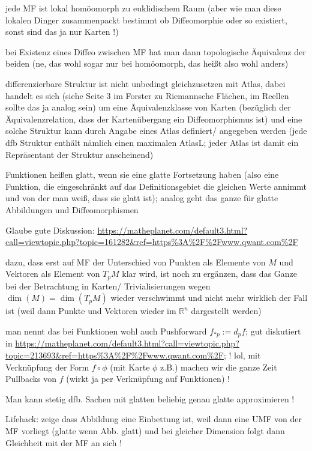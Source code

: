 jede MF ist lokal homöomorph zu euklidischem Raum (aber wie man diese lokalen Dinger zusammenpackt bestimmt ob Diffeomorphie oder so existiert, sonst sind das ja nur Karten !)


bei Existenz eines Diffeo zwischen MF hat man dann topologische Äquivalenz der beiden (ne, das wohl sogar nur bei homöomorph, das heißt also wohl anders)


differenzierbare Struktur ist nicht unbedingt gleichzusetzen mit Atlas, dabei handelt es sich (siehe Seite 3 im Forster zu Riemannsche Flächen, im Reellen sollte das ja analog sein) um eine Äquivalenzklasse von Karten (bezüglich der Äquivalenzrelation, dass der Kartenübergang ein Diffeomorphismus ist) und eine solche Struktur kann durch Angabe eines Atlas definiert/ angegeben werden (jede dfb Struktur enthält nämlich einen maximalen AtlasL; jeder Atlas ist damit ein Repräsentant der Struktur anscheinend)


Funktionen heißen glatt, wenn sie eine glatte Fortsetzung haben (also eine Funktion, die eingeschränkt auf das Definitionsgebiet die gleichen Werte annimmt und von der man weiß, dass sie glatt ist); analog geht das ganze für glatte Abbildungen und Diffeomorphismen


Glaube gute Diskussion: \url{https://matheplanet.com/default3.html?call=viewtopic.php?topic=161282\&ref=https\%3A\%2F\%2Fwww.qwant.com\%2F}

dazu, dass erst auf MF der Unterschied von Punkten als Elemente von $M$ und Vektoren als Element von $T_p M$ klar wird, ist noch zu ergänzen, dass das Ganze bei der Betrachtung in Karten/ Trivialisierungen wegen $\dim(M) = \dim(T_p M)$ wieder verschwimmt und nicht mehr wirklich der Fall ist (weil dann Punkte und Vektoren wieder im $\mathbb{R}^n$ dargestellt werden)


man nennt das bei Funktionen wohl auch Pushforward $f_{*p} := d_p f$; gut diskutiert in \url{https://matheplanet.com/default3.html?call=viewtopic.php?topic=213693\&ref=https\%3A\%2F\%2Fwww.qwant.com\%2F}; ! lol, mit Verknüpfung der Form $f \circ \phi$ (mit Karte $\phi$ z.B.) machen wir die ganze Zeit Pullbacks von $f$ (wirkt ja per Verknüpfung auf Funktionen) !



Man kann stetig dfb. Sachen mit glatten beliebig genau glatte approximieren !


Lifehack: zeige dass Abbildung eine Einbettung ist, weil dann eine UMF von der MF vorliegt (glatte wenn Abb. glatt) und bei gleicher Dimension folgt dann Gleichheit mit der MF an sich !

